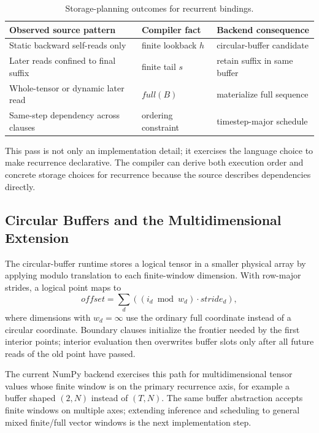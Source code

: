\documentclass[sigplan,screen,nonacm]{acmart}
\begin{document}
\begin{table}[t]
\centering
\caption{Storage-planning outcomes for recurrent bindings.}
\label{tab:storage-outcomes}
\renewcommand{\arraystretch}{1.08}
\setlength{\tabcolsep}{6pt}
\begin{tabular}{@{}lll@{}}
\toprule
Observed source pattern & Compiler fact & Backend consequence \\
\midrule
Static backward self-reads only & finite lookback $h$ & circular-buffer candidate \\
Later reads confined to final suffix & finite tail $s$ & retain suffix in same buffer \\
Whole-tensor or dynamic later read & $\mathit{full}(B)$ & materialize full sequence \\
Same-step dependency across clauses & ordering constraint & timestep-major schedule \\
\bottomrule
\end{tabular}
\end{table}

This pass is not only an implementation detail; it exercises the language choice to make recurrence declarative. The compiler can derive both execution order and concrete storage choices for recurrence because the source describes dependencies directly.

\subsection{Circular Buffers and the Multidimensional Extension}

The circular-buffer runtime stores a logical tensor in a smaller physical array by applying modulo translation to each finite-window dimension. With row-major strides, a logical point maps to
\[
\mathit{offset} =
\sum_d ((i_d \bmod w_d) \cdot \mathit{stride}_d),
\]
where dimensions with $w_d=\infty$ use the ordinary full coordinate instead of a circular coordinate. Boundary clauses initialize the frontier needed by the first interior points; interior evaluation then overwrites buffer slots only after all future reads of the old point have passed.

The current NumPy backend exercises this path for multidimensional tensor values whose finite window is on the primary recurrence axis, for example a buffer shaped $(2,N)$ instead of $(T,N)$. The same buffer abstraction accepts finite windows on multiple axes; extending inference and scheduling to general mixed finite/full vector windows is the next implementation step.
\end{document}
